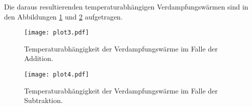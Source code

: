 Die daraus resultierenden temperaturabhängigen Verdampfungswärmen sind in den Abbildungen
\ref{fig:plot3} und \ref{fig:plot4} aufgetragen.

\begin{figure}[H]
    \centering
    \texttt{[image: plot3.pdf]}
    \caption{Temperaturabhängigkeit der Verdampfungswärme im Falle der Addition.}
    \label{fig:plot3}
\end{figure}

\begin{figure}[H]
    \centering
    \texttt{[image: plot4.pdf]}
    \caption{Temperaturabhängigkeit der Verdampfungswärme im Falle der Subtraktion.}
    \label{fig:plot4}
\end{figure}